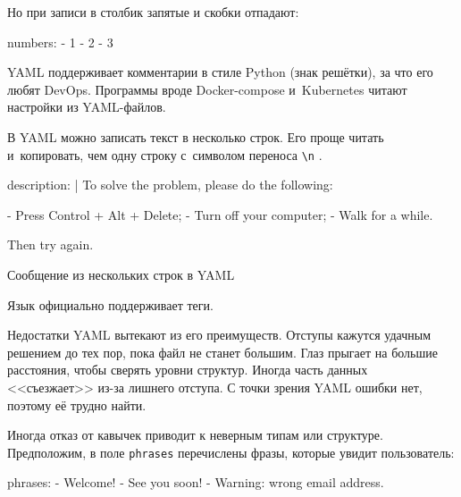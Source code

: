 \noindent
Но при записи в столбик запятые и скобки отпадают:

\begin{english}
  \begin{yaml}
numbers:
  - 1
  - 2
  - 3
  \end{yaml}
\end{english}

YAML поддерживает комментарии в стиле Python (знак решётки), за что его любят
DevOps. Программы вроде Docker-compose и~Kubernetes читают настройки из
YAML-файлов.

В YAML можно записать текст в несколько строк. Его проще читать и~копировать,
чем одну строку с~символом переноса \verb|\n| .

\begin{listing}[ht!]
  \small

\begin{english}
  \begin{yaml}
description: |
  To solve the problem, please do the following:

  - Press Control + Alt + Delete;
  - Turn off your computer;
  - Walk for a while.

  Then try again.
  \end{yaml}
\end{english}

\caption{Сообщение из нескольких строк в YAML}
\label{fig:yaml-multi-line}

\end{listing}

Язык официально поддерживает теги.


Недостатки YAML вытекают из его преимуществ. Отступы кажутся удачным решением до
тех пор, пока файл не станет большим. Глаз прыгает на большие расстояния, чтобы
сверять уровни структур. Иногда часть данных <<съезжает>> из-за лишнего
отступа. С точки зрения YAML ошибки нет, поэтому её трудно найти.

Иногда отказ от кавычек приводит к неверным типам или структуре. Предположим, в
поле \verb|phrases| перечислены фразы, которые увидит пользователь:

\begin{english}
  \begin{yaml}
phrases:
  - Welcome!
  - See you soon!
  - Warning: wrong email address.
  \end{yaml}
\end{english}

